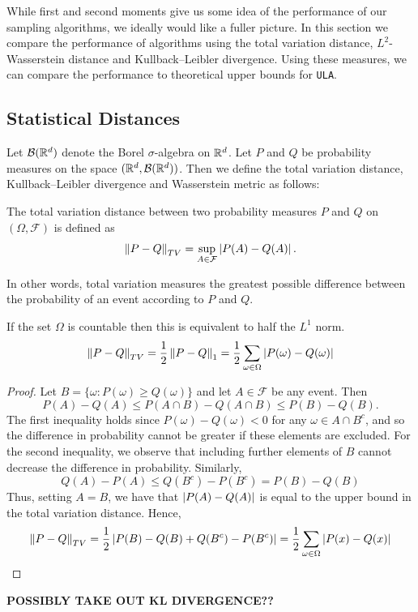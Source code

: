 While first and second moments give us some idea of the performance of our sampling algorithms, we ideally would like a fuller picture.  In this section we compare the performance of algorithms using the total variation distance, $L^2$-Wasserstein distance and Kullback--Leibler divergence.  Using these measures, we can compare the performance to theoretical upper bounds for \texttt{ULA}.

\subsection{Statistical Distances}
Let $\mathcal{B}(\mathbb{R}^d)$ denote the Borel $\sigma$-algebra on $\mathbb{R}^d$. Let $P$ and $Q$ be probability measures on the space $(\mathbb{R}^d, \mathcal{B}(\mathbb{R}^d))$.  Then we define the total variation distance, Kullback--Leibler divergence and Wasserstein metric as follows:

\begin{defn}
The total variation distance between two probability measures $P$ and $Q$ on $(\Omega, \mathcal{F})$ is defined as
$$
\norm{P - Q}_{TV} = \sup_{A \in \mathcal{F}} \abs{P(A) - Q(A)}.
$$
\end{defn}
In other words, total variation measures the greatest possible difference between the probability of an event according to $P$ and $Q$.
\begin{prop}
If the set $\Omega$ is countable then this is equivalent to half the $L^1$ norm.
$$
\norm{P - Q}_{TV} = \frac{1}{2} \norm{P-Q}_1 = \frac{1}{2} \sum_{\omega \in \Omega} \abs{P(\omega) - Q(\omega)}
$$
\end{prop}
\begin{proof}
Let $B = \{\omega: P(\omega) \geq Q(\omega)\}$ and let $A \in \mathcal{F}$ be any event.  Then
$$
P(A) - Q(A) \leq P(A \cap B) - Q(A \cap B) \leq P(B) - Q(B).
$$
The first inequality holds since $P(\omega)-Q(\omega) < 0$ for any $\omega \in A \cap B^c$, and so the difference in probability cannot be greater if these elements are excluded.  For the second inequality, we observe that including further elements of $B$ cannot decrease the difference in probability.
Similarly,
$$
Q(A) - P(A) \leq Q(B^c) - P(B^c) = P(B) - Q(B)
$$
Thus, setting $A=B$, we have that $\abs{P(A)-Q(A)}$ is equal to the upper bound in the total variation distance.  Hence,
$$
\norm{P-Q}_{TV} = \frac{1}{2} \abs{P(B)-Q(B)+Q(B^c)-P(B^c)} = \frac{1}{2} \sum_{\omega \in \Omega} \abs{P(x)-Q(x)}
$$
\end{proof}


\textbf{POSSIBLY TAKE OUT KL DIVERGENCE??}

